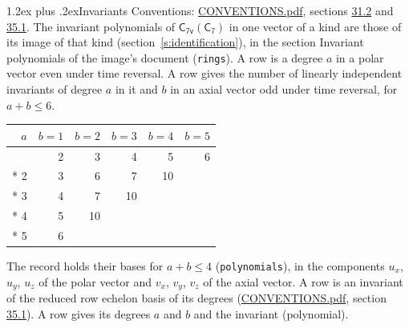 \documentclass[10pt,a4paper]{article}
\makeatletter
\renewcommand\section{\@startsection{section}{1}{\z@}{-3ex plus -1ex minus -.2ex}%
  {1.2ex plus .2ex}{\normalfont\large\sffamily\bfseries\color{parttitle}}}
\numberwithin{equation}{section}
\newcommand{\grp}[1]{\mathsf{#1}}
\makeatother
\begin{document}
\section{Invariants}\label{s:invariants}
Conventions: \href{../../CONVENTIONS.pdf}{CONVENTIONS.pdf}, sections \href{../../CONVENTIONS.pdf\#conv.31.2}{31.2} and \href{../../CONVENTIONS.pdf\#conv.35.1}{35.1}.
The invariant polynomials of $\grp{C_{7v}}(\grp{C_{7}})$ in one vector of a kind are those of its image of that kind (section~\ref{s:identification}), in the section Invariant polynomials of the image's document (\texttt{rings}).
\leavevmode\label{n:index.degree.polar}\label{n:index.degree.axial}A row is a degree $a$ in a polar vector even under time reversal. A row gives the number of linearly independent invariants of degree $a$ in it and $b$ in an axial vector odd under time reversal, for $a + b \le 6$.
{\small\begin{longtable}{@{}rrrrrr@{}}\toprule
$a$ & $b = 1$ & $b = 2$ & $b = 3$ & $b = 4$ & $b = 5$\\\midrule\endhead
\bottomrule\endfoot\endlastfoot
1 & 2 & 3 & 4 & 5 & 6\\*
2 & 3 & 6 & 7 & 10 & \\*
3 & 4 & 7 & 10 &  & \\*
4 & 5 & 10 &  &  & \\*
5 & 6 &  &  &  & \\
\bottomrule\end{longtable}}
\leavevmode\label{n:local.component.polar}\label{n:local.component.axial}The record holds their bases for $a + b \le 4$ (\texttt{polynomials}), in the components $u_{x}$, $u_{y}$, $u_{z}$ of the polar vector and $v_{x}$, $v_{y}$, $v_{z}$ of the axial vector. \label{n:head.polynomial}A row is an invariant of the reduced row echelon basis of its degrees (\href{../../CONVENTIONS.pdf}{CONVENTIONS.pdf}, section \href{../../CONVENTIONS.pdf\#conv.35.1}{35.1}). A row gives its degrees $a$ and $b$ and the invariant (polynomial).
\end{document}
